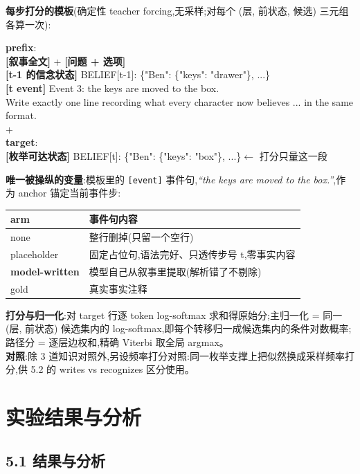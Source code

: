 \documentclass[fontset=none,10.5pt]{ctexart}
\begin{document}
\textbf{每步打分的模板}(确定性 teacher forcing,无采样;对每个 (层, 前状态, 候选) 三元组各算一次):

\begin{codebox}\small
\textbf{prefix}:\\
\textbf{[叙事全文]} + \textbf{[问题 + 选项]}\\
\textbf{[t-1 的信念状态]} BELIEF[t-1]: \{"Ben": \{"keys": "drawer"\}, ...\}\\
\textbf{[t event]}\; Event 3: the keys are moved to the box.\\
Write exactly one line recording what every character now believes ... in the same format.\\
+\\
\textbf{target}:\\
\textbf{[枚举可达状态]} BELIEF[t]: \{"Ben": \{"keys": "box"\}, ...\}\quad $\leftarrow$\; 打分只量这一段
\end{codebox}

\textbf{唯一被操纵的变量}:模板里的 \texttt{[event]} 事件句,\emph{``the keys are moved to the box.''},作为 anchor 锚定当前事件步:

\begin{center}\small
\begin{tabular}{@{}lp{24em}@{}}
\toprule
\rowcolor{tabhead}arm & 事件句内容 \\
\midrule
none & 整行删掉(只留一个空行) \\
placeholder & 固定占位句,语法完好、只透传步号 t,零事实内容 \\
\textbf{model-written} & 模型自己从叙事里提取(解析错了不剔除) \\
gold & 真实事实注释 \\
\bottomrule
\end{tabular}
\end{center}

\textbf{打分与归一化}:对 target 行逐 token log-softmax 求和得原始分;主归一化 = 同一 (层, 前状态) 候选集内的 log-softmax,即每个转移归一成候选集内的条件对数概率;路径分 = 逐层边权和,精确 Viterbi 取全局 argmax。\\
\textbf{对照}:除 3 道知识对照外,另设频率打分对照:同一枚举支撑上把似然换成采样频率打分,供 5.2 的 writes vs recognizes 区分使用。

\section{实验结果与分析}

\subsection{5.1 结果与分析}
\end{document}
